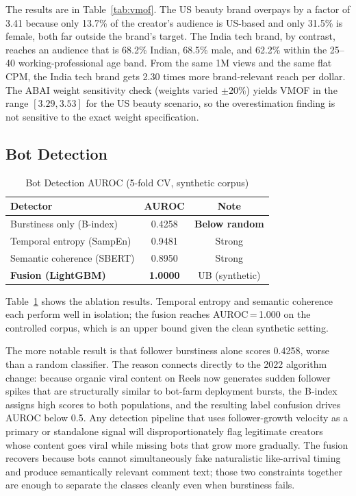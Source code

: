\documentclass[conference]{IEEEtran}
\begin{document}
The results are in Table~\ref{tab:vmof}. The US beauty brand overpays by
a factor of 3.41 because only 13.7\% of the creator's audience is US-based
and only 31.5\% is female, both far outside the brand's target. The India
tech brand, by contrast, reaches an audience that is 68.2\% Indian,
68.5\% male, and 62.2\% within the 25--40 working-professional age band.
From the same 1M views and the same flat CPM, the India tech brand gets
2.30 times more brand-relevant reach per dollar. The ABAI weight sensitivity
check (weights varied $\pm 20\%$) yields VMOF in the range $[3.29, 3.53]$
for the US beauty scenario, so the overestimation finding is not sensitive
to the exact weight specification.

\subsection{Bot Detection}

\begin{table}[t]
\caption{Bot Detection AUROC (5-fold CV, synthetic corpus)}
\label{tab:auroc}
\centering
\begin{tabular}{lcc}
\toprule
\textbf{Detector} & \textbf{AUROC} & \textbf{Note} \\
\midrule
Burstiness only (B-index) & 0.4258 & \textbf{Below random} \\
Temporal entropy (SampEn) & 0.9481 & Strong \\
Semantic coherence (SBERT) & 0.8950 & Strong \\
\textbf{Fusion (LightGBM)} & \textbf{1.0000} & UB (synthetic) \\
\bottomrule
\end{tabular}
\end{table}

Table~\ref{tab:auroc} shows the ablation results. Temporal entropy and
semantic coherence each perform well in isolation; the fusion reaches
AUROC\,=\,1.000 on the controlled corpus, which is an upper bound given
the clean synthetic setting.

The more notable result is that follower burstiness alone scores 0.4258,
worse than a random classifier. The reason connects directly to the 2022
algorithm change: because organic viral content on Reels now generates
sudden follower spikes that are structurally similar to bot-farm deployment
bursts, the B-index assigns high scores to both populations, and the
resulting label confusion drives AUROC below 0.5. Any detection pipeline
that uses follower-growth velocity as a primary or standalone signal will
disproportionately flag legitimate creators whose content goes viral while
missing bots that grow more gradually. The fusion recovers because bots
cannot simultaneously fake naturalistic like-arrival timing and produce
semantically relevant comment text; those two constraints together are
enough to separate the classes cleanly even when burstiness fails.
\end{document}
